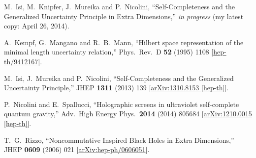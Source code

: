 \documentclass[10pt,a4paper]{article}
\begin{document}
\newpage
\begin{thebibliography}{}
  M.~Isi, M.~Knipfer, J.~Mureika and P.~Nicolini,
  ``Self-Completeness and the Generalized Uncertainty Principle in Extra Dimensions,'' \textit{in progress} (my latest copy: April 26, 2014).
  
  A.~Kempf, G.~Mangano and R.~B.~Mann,
  ``Hilbert space representation of the minimal length uncertainty relation,''
  Phys.\ Rev.\ D {\bf 52} (1995) 1108
  [\href{http://arxiv.org/abs/hep-th/9412167}{hep-th/9412167}].

  M.~Isi, J.~Mureika and P.~Nicolini,
  ``Self-Completeness and the Generalized Uncertainty Principle,''
  JHEP {\bf 1311} (2013) 139
  [\href{http://arxiv.org/abs/arXiv:1310.8153}{arXiv:1310.8153 [hep-th]}].
  
  
  P.~Nicolini and E.~Spallucci,
  ``Holographic screens in ultraviolet self-complete quantum gravity,''
  Adv.\ High Energy Phys.\  {\bf 2014} (2014) 805684
  [\href{http://arxiv.org/abs/arXiv:1210.0015}{arXiv:1210.0015 [hep-th]}].
  
  T.~G.~Rizzo,
  ``Noncommutative Inspired Black Holes in Extra Dimensions,''
  JHEP {\bf 0609} (2006) 021
  [\href{http://arxiv.org/abs/hep-ph/0606051hep-ph/0606051}{arXiv:hep-ph/0606051}].



\end{thebibliography}
\end{document}
